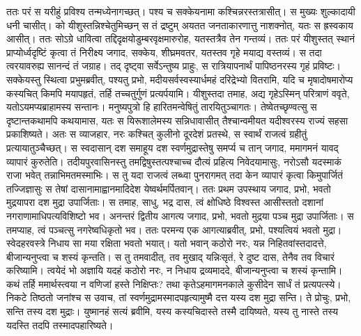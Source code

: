 \adhyAya
{}
\vakya ततः परं स यरीहुं प्रविश्य तन्मध्येनागच्छत्। पश्य च सक्केयनामा कश्चिन्नरस्तत्रासीत्।
\vakya स मुख्यः शुल्कादायी धनी चासीत्।
\vakya को यीशुस्तन्निश्चेतुमिच्छन् स तं द्रष्टुम् अयतत जनताकारणात्तु नाशक्नोत्, यतः स ह्रस्वकाय आसीत्।
\vakya ततः सोऽग्रे धावित्वा तद्दिदृक्षयोडुम्बरवृक्षमारुरोह, यतस्तत्रैव तेन गन्तव्यं।
\vakya ततः परं यीशुस्तत् स्थानं प्राप्योर्ध्वदृष्टिं कृत्वा तं निरीक्ष्य जगाद, सक्केय, शीघ्रमवतर, यतस्तव गृहे मयाद्य वस्तव्यं।
\vakya स तदा त्वरयावरुह्य सानन्दं तं जग्राह।
\vakya तद् दृष्ट्वा सर्वेऽन्तुष्य प्राहुः, स रात्रियापनार्थं पापिष्ठनरस्य गृहं प्रविष्टः।
\vakya सक्केयस्तु स्थित्वा प्रभुमब्रवीत्, पश्यतु प्रभो, मदीयसर्वस्वस्यार्धमहं दरिद्रेभ्यो वितरामि, यदि च मृषादोषमारोप्य कस्यचित् किमपि मयापहृतं, तर्हि तच्चतुर्गुणं प्रत्यर्पयामि।
\vakya यीशुस्तदा तमाह, अद्य गृहेऽस्मिन् परित्राणं ववृते, यतोऽयमप्यब्राहामस्य सन्तानः।
\vakya मनुष्यपुत्रो हि हारितमन्वेषितुं तारयितुञ्चागतः।
\vakya तेष्वेतच्छृण्वत्सु स दृष्टान्तकथामपि कथयामास, यतः स यिरूशालेमस्य सन्निधावासीत् तैश्चान्वमीयत यदीश्वरस्य राज्यं सहसा प्रकाशिष्यते।
\vakya अतः स व्याजहार, नरः कश्चित् कुलीनो दूरदेशं प्रतस्थे, स स्वार्थं राजत्वं ग्रहीतुं प्रत्यायातुञ्चैच्छत्।
\vakya स स्वदासान् दश समाहूय दश स्वर्णमुद्रास्तेषु समर्प्य च तान् जगाद, ममागमनं यावद् व्यापारं कुरुतेति।
\vakya तदीयपुरवासिनस्तु तमद्विषुस्तत्पश्चाच्च दौत्यं प्रहित्य निवेदयामासुः,
\vakya नरोऽसौ यदस्माकं राजा भवेत् तन्नाभिमतमस्माभिः। स तु यदा राजत्वं लब्ध्वा पुनरागमत् तदा केन व्यापारं कृत्वा किमुपार्जितं तज्जिज्ञासुः स तेषां दासानामाह्वानमादिदेश येष्वर्थमर्पितवान्।
\vakya ततः प्रथम उपस्थाय जगाद, प्रभो, भवतो मुद्रयापरा दश मुद्रा उपार्जिताः।
\vakya स तमाह, साधु, भद्र दास, त्वं क्षोधिष्ठे विश्वस्त आसीस्ततो दशानां नगराणामाधिपत्यविशिष्टो भव।
\vakya अनन्तरं द्वितीय आगत्य जगाद, प्रभो, भवतो मुद्रया पञ्च मुद्रा उपार्जिताः।
\vakya स तमप्याह, त्वं पञ्चत्सु नगरेष्वधिकृतो भव।
\vakya ततः परमन्य एक आगत्याब्रवीत्, प्रभो, पश्यत्वियं भवतो मुद्रा। स्वेदहरवस्त्रे निधाय सा मया रक्षिता भवतो भयात्।
\vakya यतो भवान् कठोरो नरः, यन्न निहितवांस्तदादत्ते, बीजान्यनुप्त्वा च शस्यं कृन्तति।
\vakya स तु तमवादीत्, तव मुखाद् यन्निःसृतं, रे दुष्ट दास, तेनैव तव विचारं करिष्यामि। त्वयेदं भो अज्ञायि यदहं कठोरो नरः, न निधाय द्रव्यमाददे, बीजान्यनुप्त्वा च शस्यं कृन्तामि।
\vakya कथं तर्हि ममार्थस्त्वया न वणिजां हस्ते निक्षिप्तः? तथा कृतेऽहमागमनकाले कुसीदेन सार्धं तं प्रत्यपत्स्ये।
\vakya निकटे तिष्ठतो जनांश्च स उवाच, तां स्वर्णमुद्रामस्मादपहृत्यामुष्मै दत्त यस्य दश मुद्रा सन्ति।
\vakya ते प्रोचुः, प्रभो, सन्ति तस्य दश मुद्राः।
\vakya युष्मानहं सत्यं ब्रवीमि, यस्य कस्यचिदास्ते तस्मै दायिष्यते, यस्य तु नास्ते तस्य यदस्ति तदपि तस्मादपहारिष्यते।
